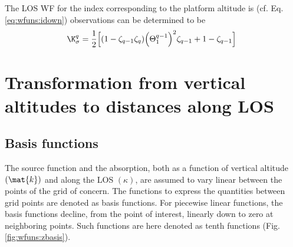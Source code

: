  The LOS WF for the index corresponding to the platform altitude is
  (cf. Eq. \ref{eq:wfuns:idown})
  observations can be determined to be
  \begin{equation}
   \K_{\sigma}^q = \frac{1}{2}\Big[ (1-\zeta_{q-1}\zeta_q) 
           \Big(\Theta^{q-1}_{1}\Big)^2
           \zeta_{q-1} + 1-\zeta_{q-1} \Big]\
  \end{equation}



\section{Transformation from vertical altitudes to distances along LOS}
 \label{sec:wfuns:bases}
 
 \subsection{Basis functions} 
 The source function and the absorption, both
 as a function of vertical altitude $(\mat{k})$ and along the LOS
 $(\kappa)$, are assumed to vary linear between the points of the grid
 of concern. The functions to express the quantities between grid
 points are denoted as basis functions. For piecewise linear functions,
 the basis functions decline, from the point of interest, linearly
 down to zero at neighboring points. Such functions are here denoted
 as tenth functions (Fig. \ref{fig:wfuns:zbasis}).
 
 
